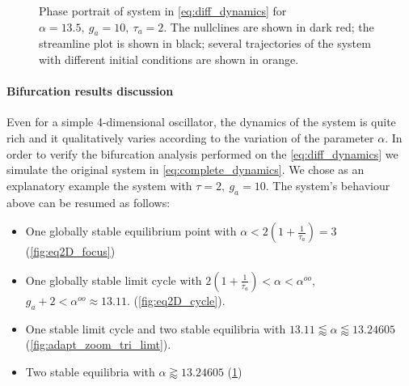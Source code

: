 \begin{figure}[!h]
        \caption{\label{fig:eq2D_cycle_after_collapse} Phase portrait of system in \eqref{eq:diff_dynamics} for $\alpha=13.5,\ g_a=10,\ \tau_a=2$. The nullclines are shown in dark red; the streamline plot is shown in black; several trajectories of the system with different initial conditions are shown in orange. }
\end{figure}

\paragraph{Bifurcation results discussion}
Even for a simple 4-dimensional oscillator, the dynamics of the system is quite rich and it qualitatively varies according to the variation of the parameter $\alpha$. In order to verify the bifurcation analysis performed on the \cref{eq:diff_dynamics} we simulate the original system in \cref{eq:complete_dynamics}.
We chose as an explanatory example the system with $\tau=2,\ g_a=10$. The system's behaviour above can be resumed as follows:
\begin{itemize}
    \item One globally stable equilibrium point with $\alpha<2(1+\frac{1}{\tau_a})=3$ (\cref{fig:eq2D_focus})
    \item One globally stable limit cycle with $2(1+\frac{1}{\tau_a}) < \alpha <\alpha^{oo}$, $ g_a + 2 < \alpha^{oo} \approx 13.11$. (\cref{fig:eq2D_cycle}). 
    \item One stable limit cycle and two stable equilibria with $13.11 \lessapprox \alpha \lessapprox 13.24605$ (\cref{fig:adapt_zoom_tri_limt}). 
    \item Two stable equilibria with $\alpha \gtrapprox 13.24605$ (\cref{fig:eq2D_cycle_after_collapse})
\end{itemize}
